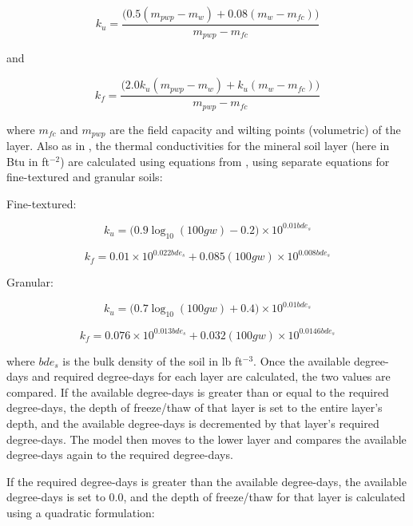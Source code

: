 \documentclass[a4paper, 12pt] {report}
\begin{document}
\begin{equation}
k_u=\frac{\Big(0.5(m_{pwp}-m_w)+ 0.08(m_w-m_{fc})\Big)}{m_{pwp}-m_{fc}}
\end{equation}

and

\begin{equation}
k_f=\frac{\Big(2.0k_u(m_{pwp}-m_w)+ k_u(m_w-m_{fc})\Big)}{m_{pwp}-m_{fc}}
\end{equation}

where $m_{fc}$ and $m_{pwp}$ are the field capacity and wilting points (volumetric) of the layer. Also as in , the thermal conductivities for the mineral soil layer (here in Btu in ft$^{-2}$) are calculated using equations from , using separate equations for fine-textured and granular soils:

Fine-textured:

\begin{equation}
k_u = \Big(0.9\log_{10}(100gw) - 0.2\Big) \times 10^{0.01bde_s}
\end{equation}

\begin{equation}
k_f= 0.01 \times 10^{0.022bde_s} + 0.085(100gw) \times 10^{0.008bde_s}
\end{equation}

Granular:

\begin{equation}
k_u = \Big(0.7\log_{10}(100gw) + 0.4\Big) \times 10^{0.01bde_s}
\end{equation}

\begin{equation}
k_f= 0.076 \times 10^{0.013bde_s} + 0.032(100gw) \times 10^{0.0146bde_s}
\end{equation}

where $bde_s$ is the bulk density of the soil in lb ft$^{-3}$. Once the available degree-days and required degree-days for each layer are calculated, the two values are compared. If the available degree-days is greater than or equal to the required degree-days, the depth of freeze/thaw of that layer is set to the entire layer’s depth, and the available degree-days is decremented by that layer’s required degree-days. The model then moves to the lower layer and compares the available degree-days again to the required degree-days.

If the required degree-days is greater than the available degree-days, the available degree-days is set to 0.0, and the depth of freeze/thaw for that layer is calculated using a quadratic formulation:
\end{document}
